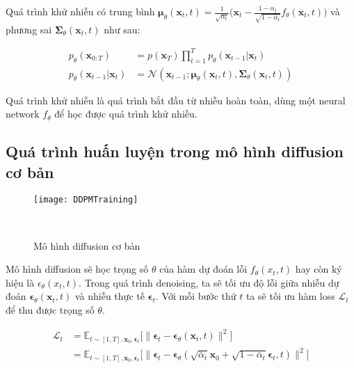 Quá trình khử nhiễu có trung bình $\boldsymbol{\mu}_\theta(\mathbf{x}_t, t) = {\frac{1}{\sqrt{\alpha_t}} \Big( \mathbf{x}_t - \frac{1 - \alpha_t}{\sqrt{1 - \bar{\alpha}_t}}  f_\theta(\mathbf{x}_t, t) \Big)}$ và phương sai $\boldsymbol{\Sigma}_\theta(\mathbf{x}_t, t)$ như sau:

\begin{equation}
	\label{eq:denoising_process}
	\begin{aligned}
		p_\theta(\mathbf{x}_{0:T})
		&= p(\mathbf{x}_T) \prod^T_{t=1} p_\theta(\mathbf{x}_{t-1} \vert \mathbf{x}_t) \\
		p_\theta(\mathbf{x}_{t-1} \vert \mathbf{x}_t) &= \mathcal{N}(\mathbf{x}_{t-1};  \boldsymbol{\mu}_\theta(\mathbf{x}_t, t), \boldsymbol{\Sigma}_\theta(\mathbf{x}_t, t))
	\end{aligned}
\end{equation}

Quá trình khử nhiễu là quá trình bắt đầu từ nhiễu hoàn toàn, dùng một neural network $f_\theta$ để học được quá trình khử nhiễu.


\subsection{Quá trình huấn luyện trong mô hình diffusion cơ bản}
	
	\begin{figure}[H]
		\centering
		\texttt{[image: DDPMTraining]}
		\caption{Mô hình diffusion cơ bản}
		\label{fig:basic_diffusion}\
		\vspace{-5pt}
	\end{figure}
	
	Mô hình diffusion sẽ học trọng số $\theta$ của hàm dự đoán lỗi $f_{\theta} (x_t, t)$ hay còn ký hiệu là  $\epsilon_{\theta} (x_t, t)$. Trong quá trình denoising, ta sẽ tối ưu độ lỗi giữa nhiễu dự đoán $\boldsymbol{\epsilon}_\theta(\mathbf{x}_t, t)$ và nhiễu thực tế $\boldsymbol{\epsilon}_t$. Với mỗi bước thứ $t$ ta sẽ tối ưu hàm loss $\mathcal{L}_{t}$ để thu được trọng số $\theta$.
	
	\begin{equation}
		\label{eq:diffusion_loss}
		\begin{aligned}
			\mathcal{L}_t
			&= \mathbb{E}_{t \sim [1, T], \mathbf{x}_0, \boldsymbol{\epsilon}_t} \Big[\|\boldsymbol{\epsilon}_t - \boldsymbol{\epsilon}_\theta(\mathbf{x}_t, t)\|^2 \Big] \\
			&= \mathbb{E}_{t \sim [1, T], \mathbf{x}_0, \boldsymbol{\epsilon}_t} \Big[\|\boldsymbol{\epsilon}_t - \boldsymbol{\epsilon}_\theta(\sqrt{\bar{\alpha}_t}\mathbf{x}_0 + \sqrt{1 - \bar{\alpha}_t}\boldsymbol{\epsilon}_t, t)\|^2 \Big]
		\end{aligned}
	\end{equation}


